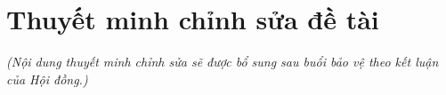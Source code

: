 \chapter*{Thuyết minh chỉnh sửa đề tài}
\label{edit}


\textit{(Nội dung thuyết minh chỉnh sửa sẽ được bổ sung sau buổi bảo vệ theo kết luận của Hội đồng.)}
